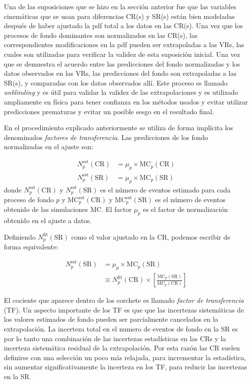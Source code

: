 Una de las suposiciones que se hizo en la sección anterior fue que las variables
cinemáticas que se usan para diferencias CR(s) y SR(s) están bien modeladas
después de haber ajustado la pdf total a los datos en las CR(s). Una vez que los
procesos de fondo dominantes son normalizados en las CR(s), las correspondientes
modificaciones en la pdf pueden ser extrapoladas a las VRs, las cuales son
utilizadas para verificar la validez de esta suposición inicial. Una vez que se
demuestra el acuerdo entre las predicciones del fondo normalizadas y los datos
observados en las VRs, las predicciones del fondo son extrapoladas a las SR(s),
y comparadas con los datos observados allí. Este proceso es llamado
\emph{unblinding} y es útil para validar la validez de las extrapolaciones y es
utilizado ampliamente en física para tener confianza en los métodos usados y
evitar utilizar predicciones prematuras y evitar un posible sesgo en el
resultado final.

En el procedimiento explicado anteriormente se utiliza de forma implícita los
denominados \emph{factores de transferencia}. Las predicciones de los fondo
normalizadas en el ajuste son:

\begin{align}
  N_p^{\text{est}}(\text{CR}) &= \mu_p \times \text{MC}_p (\text{CR})
  \\ N_p^{\text{est}}(\text{SR}) &= \mu_p \times \text{MC}_p (\text{SR})
\end{align}
%
donde $N_p^{\text{est}}(\text{CR})$ y $N_p^{\text{est}}(\text{SR})$ es el número
de eventos estimado para cada proceso de fondo $p$ y
$\text{MC}_p^{\text{est}}(\text{CR})$ y $\text{MC}_p^{\text{est}}(\text{SR})$ es
el número de eventos obtenido de las simulaciones MC. El factor $\mu_p$ es el
factor de normalización obtenido en el ajuste a datos.


Definiendo $N_p^\text{fit}(\text{SR})$ como el valor ajustado en la CR, podemos
escribir de forma equivalente:

\begin{align}
  N_p^\text{est}(\text{SR}) &= \mu_p \times \text{MC}_p (\text{SR}) \nonumber
  \\ &\equiv N_p^\text{fit}(\text{CR}) \times \left[
    \frac{\text{MC}_p(\text{SR})}{\text{MC}_p(\text{CR})} \right]
\end{align}

El cociente que aparece dentro de los corchete es llamado \emph{factor de
  transferencia} (TF). Un aspecto importante de los TF es que que las incertezas
sistemáticas de los valores estimados de fondo pueden ser parcialmente
cancelados en la extrapolación. La incerteza total en el numero de eventos de
fondo en la SR es por lo tanto una combinación de las incertezas estadísticas en
las CRs y la incerteza sistemática residual de la extrapolación. Por esta razón
las CR suelen definirse con una selección un poco más relajada, para incrementar
la estadística, sin aumentar significativamente la incerteza en los TF, para
reducir las incertezas en la SR.

